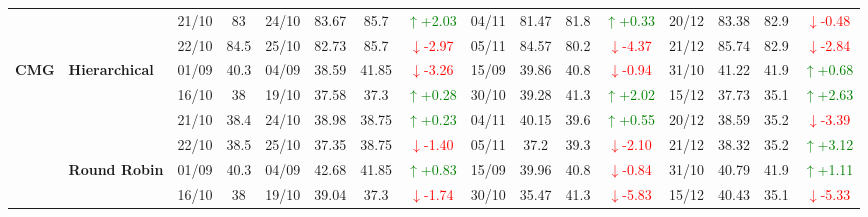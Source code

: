{\begin{longtable}{llcc|cccc|cccc|cccc}
&
& 21/10 & 83 & 24/10 & 83.67 & 85.7 & \textcolor{green}{\(\uparrow\)+2.03} & 04/11 & 81.47 & 81.8 & \textcolor{green}{\(\uparrow\)+0.33} & 20/12 & 83.38 & 82.9 & \textcolor{red}{\(\downarrow\)-0.48} \\

&
& 22/10 & 84.5 & 25/10 & 82.73 & 85.7 & \textcolor{red}{\(\downarrow\)-2.97} & 05/11 & 84.57 & 80.2 & \textcolor{red}{\(\downarrow\)-4.37} & 21/12 & 85.74 & 82.9 & \textcolor{red}{\(\downarrow\)-2.84} \\




\midrule


\multirow{12}{*}{\textbf{CMG}} 
& \textbf{Hierarchical}
& 01/09 & 40.3 & 04/09 & 38.59 & 41.85 & \textcolor{red}{\(\downarrow\)-3.26} & 15/09 & 39.86 & 40.8 & \textcolor{red}{\(\downarrow\)-0.94} & 31/10 & 41.22 & 41.9 & \textcolor{green}{\(\uparrow\)+0.68} \\

& 
& 16/10 & 38 & 19/10 & 37.58 & 37.3 & \textcolor{green}{\(\uparrow\)+0.28} & 30/10 & 39.28 & 41.3 & \textcolor{green}{\(\uparrow\)+2.02} & 15/12 & 37.73 & 35.1 & \textcolor{green}{\(\uparrow\)+2.63} \\

& 
& 21/10 & 38.4 & 24/10 & 38.98 & 38.75 & \textcolor{green}{\(\uparrow\)+0.23} & 04/11 & 40.15 & 39.6 & \textcolor{green}{\(\uparrow\)+0.55} & 20/12 & 38.59 & 35.2 & \textcolor{red}{\(\downarrow\)-3.39} \\

&
& 22/10 & 38.5 & 25/10 & 37.35 & 38.75 & \textcolor{red}{\(\downarrow\)-1.40} & 05/11 & 37.2 & 39.3 & \textcolor{red}{\(\downarrow\)-2.10} & 21/12 & 38.32 & 35.2 & \textcolor{green}{\(\uparrow\)+3.12} \\
\cmidrule(lr){2-16}


& \textbf{Round Robin}
& 01/09 & 40.3 & 04/09 & 42.68 & 41.85 & \textcolor{green}{\(\uparrow\)+0.83} & 15/09 & 39.96 & 40.8 & \textcolor{red}{\(\downarrow\)-0.84} & 31/10 & 40.79 & 41.9 & \textcolor{green}{\(\uparrow\)+1.11} \\

& 
& 16/10 & 38 & 19/10 & 39.04 & 37.3 & \textcolor{red}{\(\downarrow\)-1.74} & 30/10 & 35.47 & 41.3 & \textcolor{red}{\(\downarrow\)-5.83} & 15/12 & 40.43 & 35.1 & \textcolor{red}{\(\downarrow\)-5.33} \\


\end{longtable}}
